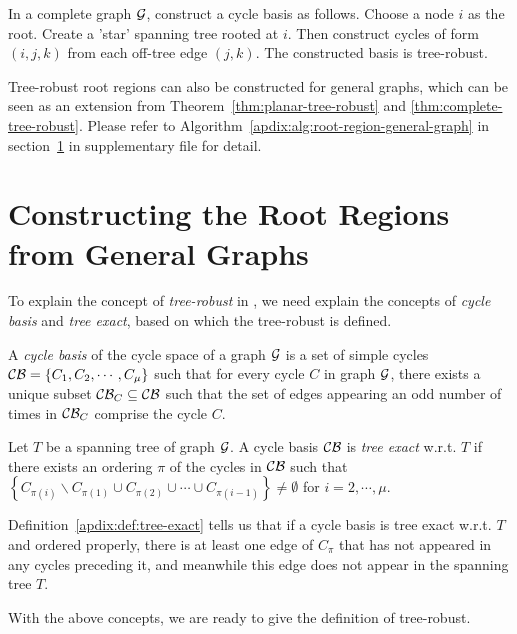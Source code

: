 \begin{theorem}\label{thm:complete-tree-robust}
  In a complete graph $\mathcal{G}$, construct a cycle basis as follows. Choose a node $i$ as the root. Create a 'star' spanning tree rooted at $i$. Then construct cycles of form $(i,j,k)$ from each off-tree edge $(j,k)$. The constructed basis is tree-robust.
\end{theorem}

Tree-robust root regions can also be constructed for general graphs, which can be seen as an extension from Theorem~\ref{thm:planar-tree-robust} and \ref{thm:complete-tree-robust}. Please refer to Algorithm~\ref{apdix:alg:root-region-general-graph} in section~\ref{apdix:sec:root-region-construct} in supplementary file for detail.

\section{Constructing the Root Regions from General Graphs}
\label{apdix:sec:root-region-construct}
To explain the concept of \textit{tree-robust} in
\cite{gelfand2012generalized}, we need explain the concepts of \textit{cycle basis} and \textit{tree exact}, based on which the tree-robust is defined.
\begin{definition}\label{apdix:def:cycle-basis}
  A \textit{cycle basis} of the cycle space of a graph $\mathcal{G}$ is a
  set of simple cycles $\mathcal{C}\mathcal{B} =\left\{ C_1, C_2, \cdots, C_{\mu}
  \right\}$ such that for every cycle $C$ in graph $\mathcal{G}$, there
  exists a unique subset $\mathcal{C}\mathcal{B}_{C} \subseteq \mathcal{C}\mathcal{B}$ such that the
  set of edges appearing an odd number of times in $\mathcal{C}\mathcal{B}_C$ comprise the cycle $C$.
\end{definition}

\begin{definition}\label{apdix:def:tree-exact}
  Let $T$ be a spanning tree of graph $\mathcal{G}$. A cycle basis $\mathcal{C}\mathcal{B}$ is
  \textit{tree exact} w.r.t. $T$ if there exists an ordering $\pi$ of
  the cycles in $\mathcal{C}\mathcal{B}$ such that $\left\{ C_{\pi(i)} \backslash C_{\pi(1)} \cup C_{\pi(2)} \cup \cdots \cup C_{\pi(i-1)} \right\} \neq \emptyset$ for $i=2,\cdots, \mu$.
\end{definition}
Definition~\ref{apdix:def:tree-exact} tells us that if a cycle basis is tree exact w.r.t. $T$ and ordered properly, there is at least one edge of $C_{\pi}$ that has not appeared in any cycles preceding it, and meanwhile this edge does not appear in the spanning tree $T$.

With the above concepts, we are ready to give the definition of tree-robust.

